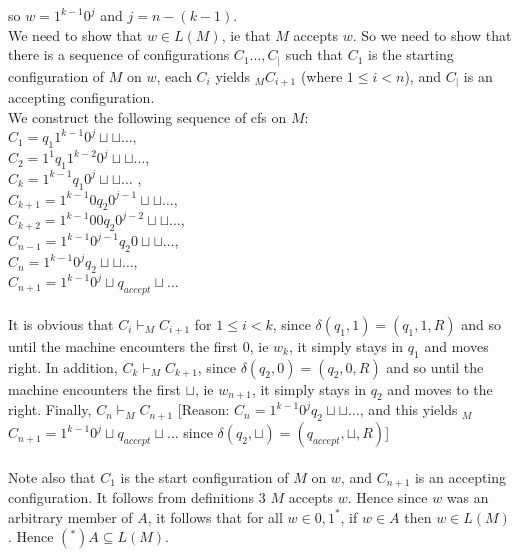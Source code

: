 \documentclass[a4paper,12pt]{article}
\begin{document}
so $w = 1^{k-1}0^{j}$ and $j = n - ( k - 1)$. \\ 
We need to show that $w \in L(M)$, ie that $M$ accepts $w$. So we need to show that there is a sequence of configurations $C_1 \dots, C_|$ such that $C_1$ is the starting configuration of $M$ on $w$, each $C_i$ yields $_M C_{i+1}$ (where $1 \leq i < n $), and $C_|$ is an accepting configuration. \\
We construct the following sequence of cfs on $M$: \\
$C_1 = q_1 1^{k-1} 0^j \sqcup \sqcup \dots$, \\
$C_2 = 1^1 q_1 1^{k-2} 0^j \sqcup \sqcup \dots$, \\
$C_k = 1^{k-1} q_1 0^j \sqcup \sqcup \dots$ , \\
$C_{k+1} = 1^{k-1} 0 q_2 0^{j-1} \sqcup \sqcup \dots$, \\
$C_{k+2} = 1^{k-1} 0 0 q_2 0^{j-2} \sqcup \sqcup \dots$, \\
$C_{n-1} = 1^{k-1} 0^{j-1} q_2 0 \sqcup \sqcup \dots$, \\
$C_n = 1^{k-1} 0^j q_2 \sqcup \sqcup \dots$, \\
$C_{n+1} = 1^{k-1} 0^j \sqcup q_{accept} \sqcup \dots$ \\
\\
It is obvious that $C_i \vdash_M C_{i+1}$ for $1 \leq i < k$, since 
$\delta ( q_1 , 1 ) = ( q_1 , 1 , R )$ and so until the machine encounters the first $0$, ie $w_k$, it simply stays in $q_1$ and moves right. In  addition, $C_k \vdash_M C_{k+1}$, since 
$\delta ( q_2 , 0 ) = ( q_2 , 0 , R )$ and so until the machine encounters the first $\sqcup$, ie $w_{n+1}$, it simply stays in $q_2$ and moves to the right. Finally, $C_n \vdash_M C_{n+1}$ [Reason: $C_n = 1^{k-1} 0^j q_2 \sqcup \sqcup \dots$, and this yields $_M$ $C_{n+1} = 1^{k-1} 0^j \sqcup q_{accept} \sqcup \dots$ since $\delta ( q_2 , \sqcup ) = ( q_{accept} , \sqcup , R )$]  \\
\\
Note also that $C_1$ is the start configuration of $M$ on $w$, and $C_{n+1}$ is an accepting configuration. It follows from definitions 3 $M$ accepts $w$. Hence since $w$ was an arbitrary member of $A$, it follows that for all $w \in {0,1}^*$, if $w \in A$ then $w \in L(M)$. Hence $(^*) A \subseteq L(M)$. \\
\end{document}
